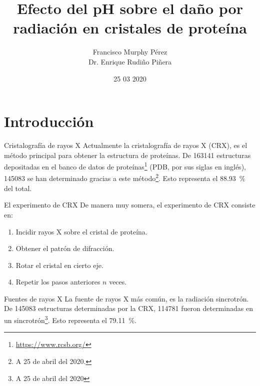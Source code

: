 \documentclass{beamer}
\title{Efecto del pH sobre el daño por radiación en cristales de proteína}
\author{Francisco Murphy Pérez \\ Dr. Enrique Rudiño Piñera}
\institute{Instituto de Biotecnología \\ Universidad Nacional Autónoma de México}
\date{25 03 2020}
\begin{document}
\begin{frame}
	\maketitle %
\end{frame}
\section{Introducción}
\begin{frame}{Cristalografía de rayos X}
Actualmente la cristalografía de rayos X (CRX), es el método principal para obtener la estructura de proteínas. De 163141 estructuras depositadas en el banco de datos de proteínas\footnote{\url{https://www.rcsb.org/}} (PDB, por sus siglas en inglés), 145083 se han determinado gracias a este método\footnote{A 25 de abril del 2020.}. Esto representa el \SI{88.93}{\percent} del total.
\end{frame}
\begin{frame}{El experimento de CRX}
De manera muy somera, el experimento de CRX consiste en:
 \begin{enumerate}
  \item Incidir \alert{rayos X} sobre el cristal de proteína. 
  \item Obtener el patrón de difracción. 
  \item Rotar el cristal en cierto eje. 
  \item Repetir los pasos anteriores $n$ veces.
 \end{enumerate}
\end{frame}
\begin{frame}{Fuentes de rayos X}
 La fuente de rayos X más común, es la radiación sincrotrón. De 145083 estructuras determinadas por la CRX, 114781 fueron determinadas en un sincrotrón\footnote{A 25 de abril del 2020}. Esto representa el \SI{79.11}{\percent}.
\end{frame}
\end{document}
